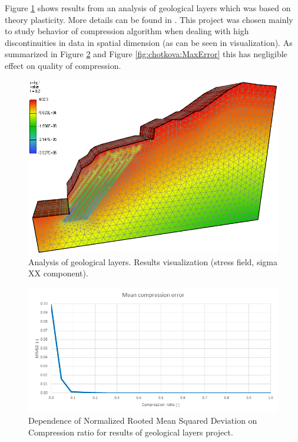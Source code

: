 Figure \ref{fig:chotkova:mesh}  shows results from an analysis of geological layers which was based on theory plasticity. More details can be found in \cite{Koudelka2006}. This project was chosen mainly to study behavior of compression algorithm when dealing with high discontinuities in data in spatial dimension (as can be seen in visualization). As summarized in Figure \ref{fig:chotkova:NRMSD} and Figure \ref{fig:chotkova:MaxError} this has negligible effect on quality of compression.

\begin{figure}[H]
\centering
\includegraphics[width=\textwidth]{figures/appendix-SVD/chotkova_screenshot}
\decoRule
\caption{Analysis of geological layers. Results visualization (stress field, sigma XX component).}
\label{fig:chotkova:mesh}
\end{figure}

\begin{figure}[H]
\centering
\includegraphics[width=\textwidth]{figures/appendix-SVD/chotkova_NRMSD}
\decoRule
\caption{Dependence of Normalized Rooted Mean Squared Deviation on Compression ratio for results of geological layers project.}
\label{fig:chotkova:NRMSD}
\end{figure}

